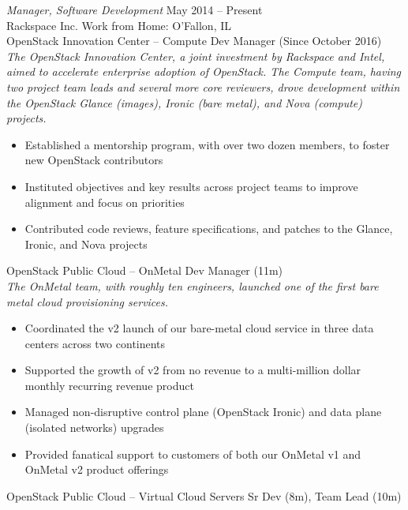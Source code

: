\documentclass[margin,line]{resume}
\begin{document}
\begin{resume}
{\sl Manager, Software Development}  \hfill  May 2014 -- Present\\
Rackspace Inc.  \hfill  Work from Home: O'Fallon, IL\\
{\small OpenStack Innovation Center -- Compute  \hfill  Dev Manager (Since October 2016)}\\
{\small\textit{The OpenStack Innovation Center, a joint investment by Rackspace and Intel, aimed to accelerate
enterprise adoption of OpenStack. The Compute team, having two project team leads and several more core reviewers, drove
development within the OpenStack Glance (images), Ironic (bare metal), and Nova (compute) projects.}}
\begin{itemize} \itemsep -2pt %
\small\item Established a mentorship program, with over two dozen members, to foster new OpenStack contributors
\small\item Instituted objectives and key results across project teams to improve alignment and focus on priorities
\small\item Contributed code reviews, feature specifications, and patches to the Glance, Ironic, and Nova projects
\end{itemize}\vspace*{-\baselineskip} %
\vspace{1pt}
{\small OpenStack Public Cloud -- OnMetal  \hfill  Dev Manager (11m)}\\
{\small\textit{The OnMetal team, with roughly ten engineers, launched one of the first bare metal cloud provisioning services.}}
\begin{itemize} \itemsep -2pt %
\small\item Coordinated the v2 launch of our bare-metal cloud service in three data centers across two continents
\small\item Supported the growth of v2 from no revenue to a multi-million dollar monthly recurring revenue product
\small\item Managed non-disruptive control plane (OpenStack Ironic) and data plane (isolated networks) upgrades
\small\item Provided fanatical support to customers of both our OnMetal v1 and OnMetal v2 product offerings
\end{itemize}\vspace{-\baselineskip} %
\vspace{1pt}
{\small OpenStack Public Cloud -- Virtual Cloud Servers  \hfill  Sr Dev (8m), Team Lead (10m)}\\

\end{resume}
\end{document}
